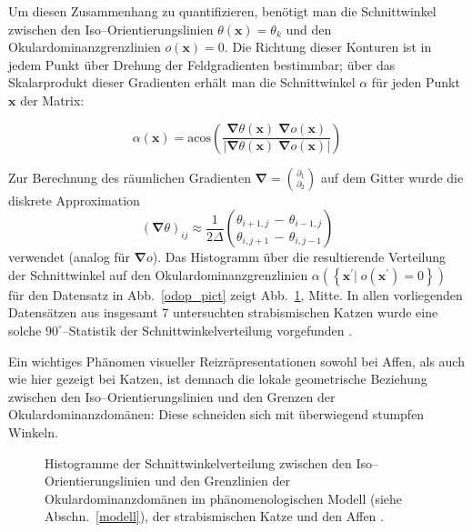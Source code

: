 Um diesen Zusammenhang zu quantifizieren, benötigt man die Schnittwinkel
zwischen den Iso--Orientierungslinien $\theta(\mathbf{x})=\theta_k$ und den
Okulardominanzgrenzlinien $o(\mathbf{x}) = 0$.  Die Richtung dieser
Konturen ist in jedem Punkt über Drehung der Feldgradienten bestimmbar;
über das Skalarprodukt dieser Gradienten erhält man die Schnittwinkel
$\alpha$ für jeden Punkt $\mathbf{x}$ der Matrix:

\begin{equation*}
\alpha(\mathbf{x})=\text{acos}\!\left(\frac{\pmb\nabla\theta(\mathbf{x})
\;\pmb\nabla o(\mathbf{x})}{\vert\pmb\nabla\theta(\mathbf{x})\;\pmb\nabla
o(\mathbf{x})\vert}\right)
\end{equation*}

Zur Berechnung des räumlichen Gradienten $\pmb\nabla =
{\binom{\partial_1}{\partial_2}}$ auf dem Gitter wurde die diskrete
Approximation
\begin{equation*}
(\pmb\nabla\theta)_{ij}\approx\frac{1}{2\Delta}{\binom{\theta_{i+1,j}\,-\,\theta_{i-1,j}}{\theta_{i,j+1}\,-\,\theta_{i,j-1}}}
\end{equation*}
verwendet (analog für $\pmb\nabla o$). Das Histogramm über die
resultierende Verteilung der Schnittwinkel auf den
Okulardominanzgrenzlinien $\alpha(\left\{\mathbf{x}^\prime\vert\;
o(\mathbf{x}^\prime)=0\right\})$ für den Datensatz in Abb.~\ref{odop_pict}
zeigt Abb.~\ref{odop_hist}, Mitte. In allen vorliegenden Datensätzen aus
insgesamt 7 untersuchten strabismischen Katzen wurde eine solche
$90^\circ$--Statistik der Schnittwinkelverteilung vorgefunden
.

Ein wichtiges Phänomen visueller Reizräpresentationen sowohl bei Affen,
als auch wie hier gezeigt bei Katzen, ist demnach die lokale geometrische
Beziehung zwischen den Iso--Orientierungslinien und den Grenzen der
Okulardominanzdomänen: Diese schneiden sich mit überwiegend stumpfen
Winkeln.

\begin{figure}[t]
\centering
{}
\caption{Histogramme der Schnittwinkelverteilung zwischen den
Iso--Orien\-tier\-ungs\-linien und den Grenzlinien der Okulardominanzdomänen
im phänomenologischen Modell (siehe Abschn.~\ref{modell}), der
strabismischen Katze \protect{} und den Affen
\protect{}.}
\label{odop_hist}
\end{figure}

